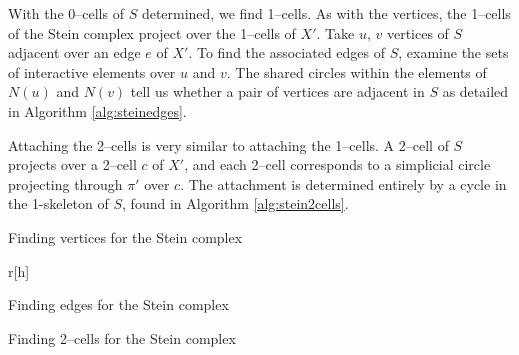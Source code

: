 With the 0--cells of $S$ determined, we find 1--cells.
As with the vertices, the 1--cells of the Stein complex project over the 1--cells of $X'$.
Take $u$, $v$ vertices of $S$ adjacent over an edge $e$ of $X'$.
To find the associated edges of $S$, examine the sets of interactive elements over $u$ and $v$.
The shared circles within the elements of $N(u)$ and $N(v)$ tell us whether a pair of vertices are adjacent in $S$ as detailed in Algorithm \ref{alg:steinedges}.

Attaching the 2--cells is very similar to attaching the 1--cells.
A 2--cell of $S$ projects over a 2--cell $c$ of $X'$, and each 2--cell corresponds to a simplicial circle projecting through $\pi'$ over $c$.
The attachment is determined entirely by a cycle in the 1-skeleton of $S$, found in Algorithm \ref{alg:stein2cells}.

\begin{algorithm}[h]
	\caption{Finding vertices for the Stein complex}
	\label{alg:steinvertices}
\end{algorithm}

\begin{algorithm}r[h]
	\caption{Finding edges for the Stein complex}
	\label{alg:steinedges}
\end{algorithm}

\begin{algorithm}[h]
	\caption{Finding 2--cells for the Stein complex}
	\label{alg:stein2cells}
\end{algorithm}


